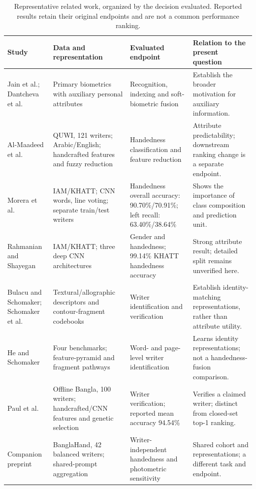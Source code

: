 \documentclass[ASNA,twocolumn]{USG}
\begin{document}
\begin{table}[!t]
\caption{Representative related work, organized by the decision evaluated. Reported results retain their original endpoints and are not a common performance ranking.}\label{tab:related}
\centering
\begin{tabularx}{\textwidth}{@{}p{}p{}p{}X@{}}\toprule
Study & Data and representation & Evaluated endpoint & Relation to the present question\\\midrule
Jain et al.; Dantcheva et al.\ \cite{jain2004soft,dantcheva2016soft} & Primary biometrics with auxiliary personal attributes & Recognition, indexing and soft-biometric fusion & Establish the broader motivation for auxiliary information.\\
Al-Maadeed et al.\ \cite{almaadeed2016handedness} & QUWI, 121 writers; Arabic/English; handcrafted features and fuzzy reduction & Handedness classification and feature reduction & Attribute predictability; downstream ranking change is a separate endpoint.\\
Morera et al.\ \cite{morera2018handedness} & IAM/KHATT; CNN words, line voting; separate train/test writers & Handedness overall accuracy: 90.70\%/70.91\%; left recall: 63.40\%/38.64\% & Shows the importance of class composition and prediction unit.\\
Rahmanian and Shayegan \cite{rahmanian2021handedness} & IAM/KHATT; three deep CNN architectures & Gender and handedness; 99.14\% KHATT handedness accuracy & Strong attribute result; detailed split remains unverified here.\\
Bulacu and Schomaker; Schomaker et al.\ \cite{bulacu2007text,schomaker2007codebooks} & Textural/allographic descriptors and contour-fragment codebooks & Writer identification and verification & Establish identity-matching representations, rather than attribute utility.\\
He and Schomaker \cite{he2020fragnet} & Four benchmarks; feature-pyramid and fragment pathways & Word- and page-level writer identification & Learns identity representations; not a handedness-fusion comparison.\\
Paul et al.\ \cite{paul2024bangla} & Offline Bangla, 100 writers; handcrafted/CNN features and genetic selection & Writer verification; reported mean accuracy 94.54\% & Verifies a claimed writer; distinct from closed-set top-1 ranking.\\
Companion preprint \cite{prappo2026handedness} & BanglaHand, 42 balanced writers; shared-prompt aggregation & Writer-independent handedness and photometric sensitivity & Shared cohort and representations; a different task and endpoint.\\\bottomrule
\end{tabularx}
\end{table}
\end{document}
